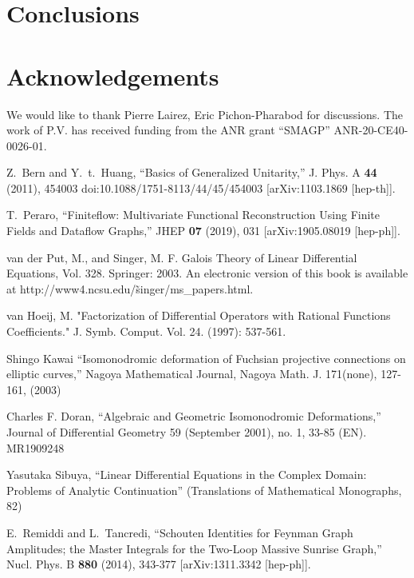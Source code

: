 \documentclass[a4paper,12pt]{article}
\numberwithin{equation}{section}
\numberwithin{figure}{section}
\begin{document}
\section{Conclusions}


\section*{Acknowledgements}
We would like to thank Pierre Lairez, Eric Pichon-Pharabod  for discussions.
The work of P.V. has received funding from the ANR grant ``SMAGP''
ANR-20-CE40-0026-01.

\begin{thebibliography}{99}

Z.~Bern and Y.~t.~Huang,
``Basics of Generalized Unitarity,''
J. Phys. A \textbf{44} (2011), 454003
doi:10.1088/1751-8113/44/45/454003
[arXiv:1103.1869 [hep-th]].
  
T.~Peraro,
``Finiteflow: Multivariate Functional Reconstruction Using Finite Fields and Dataflow Graphs,''
JHEP \textbf{07} (2019), 031
[arXiv:1905.08019 [hep-ph]].

  
 van der Put, M., and Singer, M. F. Galois Theory of Linear Differential Equations, Vol. 328. Springer: 2003. An electronic version of this book is available at http://www4.ncsu.edu/\~singer/ms\_papers.html.

  van Hoeij, M. "Factorization of Differential Operators with Rational Functions Coefficients." J. Symb. Comput. Vol. 24. (1997): 537-561.

  
 Shingo Kawai ``Isomonodromic deformation of Fuchsian projective connections on elliptic curves,'' Nagoya Mathematical Journal, Nagoya Math. J. 171(none), 127-161, (2003)
  
 Charles F. Doran, ``Algebraic and Geometric Isomonodromic Deformations,'' Journal of Differential Geometry 59 (September 2001), no. 1, 33-85 (EN). MR1909248
   
   Yasutaka Sibuya, ``Linear Differential Equations in the Complex Domain: Problems of Analytic Continuation'' (Translations of Mathematical Monographs, 82)

E.~Remiddi and L.~Tancredi,
``Schouten Identities for Feynman Graph Amplitudes; the Master Integrals for the Two-Loop Massive Sunrise Graph,''
Nucl. Phys. B \textbf{880} (2014), 343-377
[arXiv:1311.3342 [hep-ph]].


\end{thebibliography}
\end{document}
